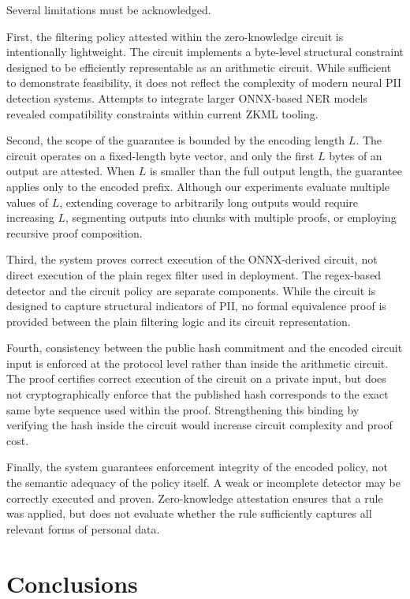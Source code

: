 \documentclass[10pt,conference,a4paper]{IEEEtran}
\begin{document}
Several limitations must be acknowledged.

First, the filtering policy attested within the zero-knowledge circuit is intentionally lightweight. The circuit implements a byte-level structural constraint designed to be efficiently representable as an arithmetic circuit. While sufficient to demonstrate feasibility, it does not reflect the complexity of modern neural PII detection systems. Attempts to integrate larger ONNX-based NER models revealed compatibility constraints within current ZKML tooling. 

Second, the scope of the guarantee is bounded by the encoding length $L$. The circuit operates on a fixed-length byte vector, and only the first $L$ bytes of an output are attested. When $L$ is smaller than the full output length, the guarantee applies only to the encoded prefix. Although our experiments evaluate multiple values of $L$, extending coverage to arbitrarily long outputs would require increasing $L$, segmenting outputs into chunks with multiple proofs, or employing recursive proof composition.

Third, the system proves correct execution of the ONNX-derived circuit, not direct execution of the plain regex filter used in deployment. The regex-based detector and the circuit policy are separate components. While the circuit is designed to capture structural indicators of PII, no formal equivalence proof is provided between the plain filtering logic and its circuit representation.

Fourth, consistency between the public hash commitment and the encoded circuit input is enforced at the protocol level rather than inside the arithmetic circuit. The proof certifies correct execution of the circuit on a private input, but does not cryptographically enforce that the published hash corresponds to the exact same byte sequence used within the proof. Strengthening this binding by verifying the hash inside the circuit would increase circuit complexity and proof cost.

Finally, the system guarantees enforcement integrity of the encoded policy, not the semantic adequacy of the policy itself. A weak or incomplete detector may be correctly executed and proven. Zero-knowledge attestation ensures that a rule was applied, but does not evaluate whether the rule sufficiently captures all relevant forms of personal data.

\section{Conclusions}
\end{document}
